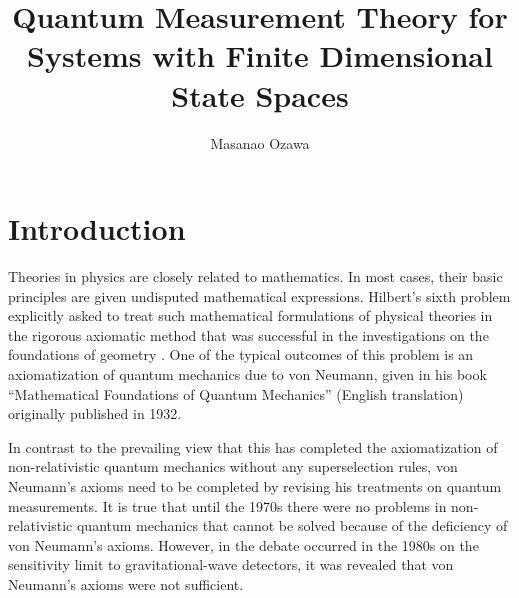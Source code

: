 \documentclass[graybox]{svmult}
\date{}
\begin{document}
\title*{Quantum Measurement Theory for Systems with Finite Dimensional State Spaces}
\author{Masanao Ozawa}
\maketitle
{} 

\section{Introduction}

Theories in physics are closely related to mathematics.
In most cases, their basic principles are given undisputed 
mathematical expressions.
Hilbert's sixth problem explicitly asked to treat such mathematical
formulations of physical theories in the rigorous axiomatic method
that was successful in the investigations on the foundations of geometry
\cite{Hil03}.
One of the typical outcomes of this problem is an axiomatization of 
quantum mechanics due to von Neumann, given in his
book ``Mathematical Foundations of Quantum Mechanics''  (English translation) \cite{vN32E}
originally published in 1932.

In contrast to the prevailing view that this has completed 
the axiomatization of non-relativistic quantum mechanics without
any superselection rules, von Neumann's axioms need to be
completed by revising his treatments on quantum measurements.
It is true that until the 1970s there were no problems in non-relativistic
quantum mechanics that cannot be solved because of the deficiency 
of von Neumann's axioms.
However, in the debate occurred in the 1980s on the sensitivity limit 
to gravitational-wave detectors, it was revealed that 
von Neumann's axioms were not sufficient.
\end{document}
